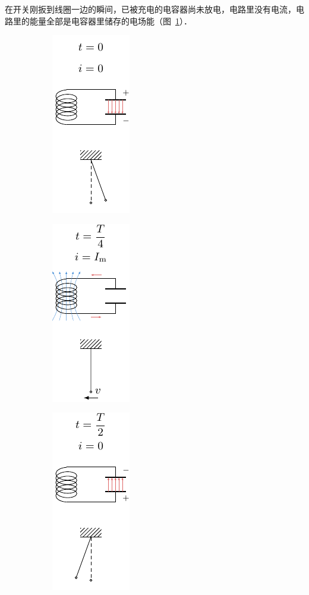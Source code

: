 在开关刚扳到线圈一边的瞬间，已被充电的电容器尚未放电，电路里没有电流，电路里的能量全部是电容器里储存的电场能（图~\ref{fig_C_4-2a}）．
\begin{figure}[htbp]
    \centering
    \begin{subfigure}{0.19\linewidth}
        \centering
        \includegraphics{fig/C/4-2a.pdf}
        \caption{}\label{fig_C_4-2a}
    \end{subfigure}
    \hfil
    \begin{subfigure}{0.19\linewidth}
        \centering
        \includegraphics{fig/C/4-2b.pdf}
        \caption{}\label{fig_C_4-2b}
    \end{subfigure}
    \hfil
    \begin{subfigure}{0.19\linewidth}
        \centering
        \includegraphics{fig/C/4-2c.pdf}

\end{subfigure}
\end{figure}
